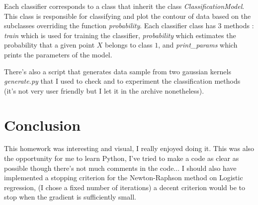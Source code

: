 \documentclass[a4paper, 11pt]{article}
\newcommand{\file}[1]{\emph{#1}}
\newcommand{\name}[1]{\emph{#1}}
\begin{document}
Each classifier corresponds to a class that inherit the class
\name{ClassificationModel}. This class is responsible for classifying
and plot the contour of data based on the subclasses overriding the
function \name{probability}. Each classifier class has 3 methods :
\name{train} which is used for training the classifier,
\name{probability} which estimates the probability that a given point
$X$ belongs to class $1$, and \name{print\_params} which prints the
parameters of the model.

There's also a script that generates data sample from two gaussian
kernels \file{generate.py} that I used to check and to experiment
the classification methods (it's not very user friendly but I let
it in the archive nonetheless).


\section{Conclusion}

This homework was interesting and visual, I really enjoyed doing
it. This was also the opportunity for me to learn Python, I've tried
to make a code as clear as possible though there's not much comments
in the code... I should also have implemented a stopping criterion for
the Newton-Raphson method on Logistic regression, (I chose a fixed
number of iterations) a decent criterion would be to stop when the
gradient is sufficiently small.
\end{document}
